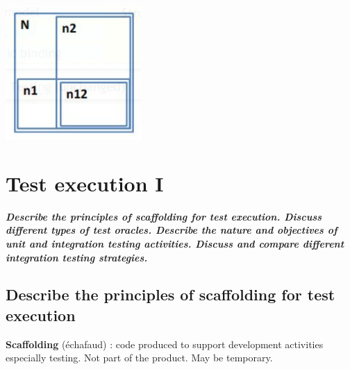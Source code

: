 \documentclass{article}
\begin{document}
\begin{multicols}{2}
\begin{center}
    \includegraphics[scale = 0.6]{image/22.PNG}
\end{center}

\vfill\null
\end{multicols}



\newpage
\section{Test execution I}
\textbf{\textit{Describe the principles of scaffolding for test execution. Discuss different types of test oracles. Describe the nature and objectives of unit and integration testing activities. Discuss and compare different integration testing strategies.}}

\subsection{Describe the principles of scaffolding for test execution}
\noindent \textbf{Scaffolding} (échafaud) :
code produced to support development activities especially testing. Not part of the product. May be temporary.\\
\end{document}
